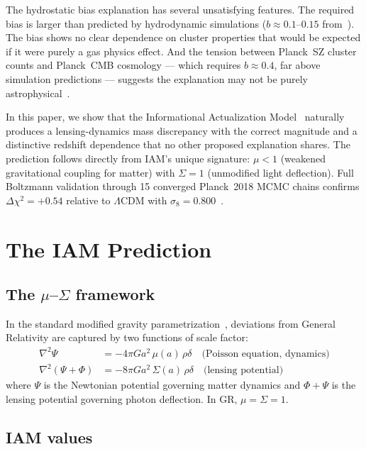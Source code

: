 \documentclass[12pt,a4paper]{article}
\begin{document}
The hydrostatic bias explanation has several unsatisfying features. The required
bias is larger than predicted by hydrodynamic simulations ($b \approx 0.1$--$0.15$
from~\citep{Lau2009,Nelson2014}). The bias shows no clear dependence on cluster
properties that would be expected if it were purely a gas physics effect. And
the tension between Planck~SZ cluster counts and Planck~CMB cosmology --- which
requires $b \approx 0.4$, far above simulation predictions --- suggests the
explanation may not be purely astrophysical~\citep{PlanckClusters2016}.

In this paper, we show that the Informational Actualization
Model~\citep{Mahaffey2026a,Mahaffey2026b} naturally produces a lensing-dynamics
mass discrepancy with the correct magnitude and a distinctive redshift dependence
that no other proposed explanation shares. The prediction follows directly from
IAM's unique signature: $\mu < 1$ (weakened gravitational coupling for matter)
with $\Sigma = 1$ (unmodified light deflection). Full Boltzmann validation
through 15 converged Planck~2018 MCMC chains confirms $\Delta\chi^2 = +0.54$
relative to $\Lambda$CDM with $\sigma_8 = 0.800$~\citep{Mahaffey2026a}.

\section{The IAM Prediction}

\subsection{The $\mu$--$\Sigma$ framework}

In the standard modified gravity
parametrization~\citep{Pogosian2016,Amendola2008}, deviations from General
Relativity are captured by two functions of scale factor:
\begin{align}
\nabla^2\Psi &= -4\pi G a^2\, \mu(a)\, \rho\delta
\quad \text{(Poisson equation, dynamics)} \\
\nabla^2(\Psi + \Phi) &= -8\pi G a^2\, \Sigma(a)\, \rho\delta
\quad \text{(lensing potential)}
\end{align}
where $\Psi$ is the Newtonian potential governing matter dynamics and
$\Phi + \Psi$ is the lensing potential governing photon deflection.
In GR, $\mu = \Sigma = 1$.

\subsection{IAM values}
\end{document}
